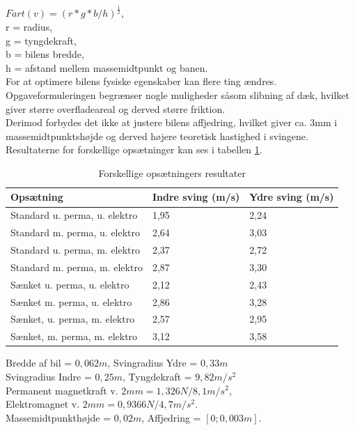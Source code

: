 \( Fart(v) = (r*g*b/h)^\frac{1}{2} \), \\
r = radius,\\
g = tyngdekraft, \\
b = bilens bredde, \\
h = afstand mellem massemidtpunkt og banen. \\

For at optimere bilens fysiske egenskaber kan flere ting ændres. Opgaveformuleringen begrænser nogle muligheder såsom slibning af dæk, hvilket giver større overfladeareal og derved større friktion. \\

Derimod forbydes det ikke at justere bilens affjedring, hvilket giver ca. 3mm i massemidtpunktshøjde og derved højere teoretisk hastighed i svingene. Resultaterne for forskellige opsætninger kan ses i tabellen \ref{forskel_opsaat_result}. \\

\begin{table}[H]
\centering
\begin{tabular}{|l|l|l|}
\hline
Opsætning                      & Indre sving (m/s) & Ydre sving (m/s) \\ \hline
Standard u. perma,  u. elektro & 1,95              & 2,24             \\ \hline
Standard m. perma, u. elektro  & 2,64              & 3,03             \\ \hline
Standard u. perma, m. elektro  & 2,37              & 2,72             \\ \hline
Standard m. perma, m. elektro  & 2,87              & 3,30             \\ \hline
Sænket u. perma, u. elektro    & 2,12              & 2,43             \\ \hline
Sænket m. perma, u. elektro    & 2,86              & 3,28             \\ \hline
Sænket, u. perma, m. elektro   & 2,57              & 2,95             \\ \hline
Sænket, m. perma, m. elektro   & 3,12              & 3,58             \\ \hline
\end{tabular}
\caption{Forskellige opsætningers resultater}
\label{forskel_opsaat_result}
\end{table} 

Bredde af bil = \( 0,062m \), Svingradius Ydre = \( 0,33m \) \\
Svingradius Indre = \( 0,25m \), Tyngdekraft = \( 9,82m/s^2 \) \\
Permanent magnetkraft v. \( 2mm = 1,326N/8,1 m/s^2 \), \\
Elektromagnet v. \( 2mm = 0,9366N/4,7 m/s^2. \) \\  
Massemidtpunkthøjde = \( 0,02m \), Affjedring = \( [0;0,003m]. \) \\

